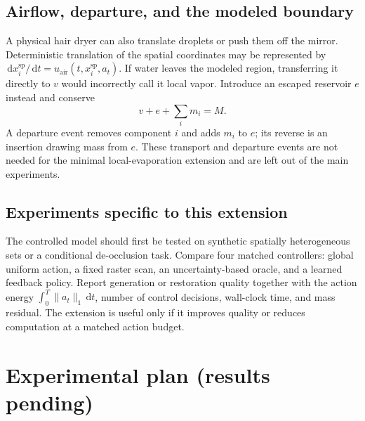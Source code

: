 \documentclass[10pt]{article}
\theoremstyle{definition}
\theoremstyle{remark}
\newcommand{\dd}{\,\mathrm{d}}
\begin{document}
\subsection{Airflow, departure, and the modeled boundary}

A physical hair dryer can also translate droplets or push them off the
mirror.  Deterministic translation of the spatial coordinates may be
represented by
$\dd x_i^{\mathrm{sp}}/\dd t
=u_{\mathrm{air}}(t,x_i^{\mathrm{sp}},a_t)$.  If water leaves the modeled
region, transferring it directly to $v$ would incorrectly call it local
vapor.  Introduce an escaped reservoir $e$ instead and conserve
\begin{equation}
  v+e+\sum_i m_i=M.
  \label{eq:extended-mass-balance}
\end{equation}
A departure event removes component $i$ and adds $m_i$ to $e$; its reverse
is an insertion drawing mass from $e$.  These transport and departure events
are not needed for the minimal local-evaporation extension and are left out
of the main experiments.

\subsection{Experiments specific to this extension}

The controlled model should first be tested on synthetic spatially
heterogeneous sets or a conditional de-occlusion task.  Compare four matched
controllers: global uniform action, a fixed raster scan, an uncertainty-based
oracle, and a learned feedback policy.  Report generation or restoration
quality together with the action energy
$\int_0^T\|a_t\|_1\dd t$, number of control decisions, wall-clock time, and
mass residual.  The extension is useful only if it improves quality or
reduces computation at a matched action budget.

\section{Experimental plan (results pending)}
\label{sec:experiments}

\begin{center}
\end{center}
\end{document}
